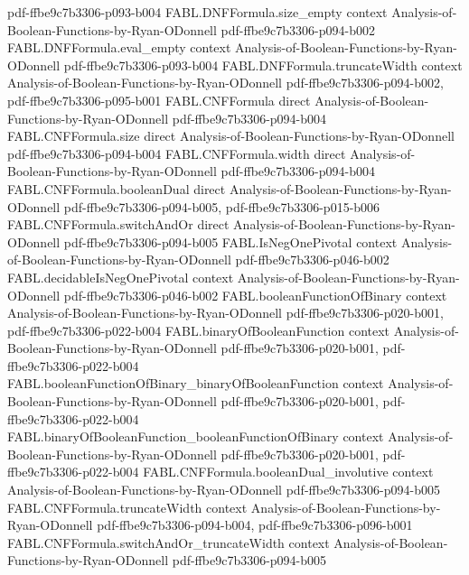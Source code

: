 \begin{theorem}
  {pdf-ffbe9c7b3306-p093-b004}
\proofstep
  {FABL.DNFFormula.size_empty}
  {context}
  {Analysis-of-Boolean-Functions-by-Ryan-ODonnell}
  {pdf-ffbe9c7b3306-p094-b002}
\proofstep
  {FABL.DNFFormula.eval_empty}
  {context}
  {Analysis-of-Boolean-Functions-by-Ryan-ODonnell}
  {pdf-ffbe9c7b3306-p093-b004}
\proofstep
  {FABL.DNFFormula.truncateWidth}
  {context}
  {Analysis-of-Boolean-Functions-by-Ryan-ODonnell}
  {pdf-ffbe9c7b3306-p094-b002,
    pdf-ffbe9c7b3306-p095-b001}
\proofstep
  {FABL.CNFFormula}
  {direct}
  {Analysis-of-Boolean-Functions-by-Ryan-ODonnell}
  {pdf-ffbe9c7b3306-p094-b004}
\proofstep
  {FABL.CNFFormula.size}
  {direct}
  {Analysis-of-Boolean-Functions-by-Ryan-ODonnell}
  {pdf-ffbe9c7b3306-p094-b004}
\proofstep
  {FABL.CNFFormula.width}
  {direct}
  {Analysis-of-Boolean-Functions-by-Ryan-ODonnell}
  {pdf-ffbe9c7b3306-p094-b004}
\proofstep
  {FABL.CNFFormula.booleanDual}
  {direct}
  {Analysis-of-Boolean-Functions-by-Ryan-ODonnell}
  {pdf-ffbe9c7b3306-p094-b005,
    pdf-ffbe9c7b3306-p015-b006}
\proofstep
  {FABL.CNFFormula.switchAndOr}
  {direct}
  {Analysis-of-Boolean-Functions-by-Ryan-ODonnell}
  {pdf-ffbe9c7b3306-p094-b005}
\proofstep
  {FABL.IsNegOnePivotal}
  {context}
  {Analysis-of-Boolean-Functions-by-Ryan-ODonnell}
  {pdf-ffbe9c7b3306-p046-b002}
\proofstep
  {FABL.decidableIsNegOnePivotal}
  {context}
  {Analysis-of-Boolean-Functions-by-Ryan-ODonnell}
  {pdf-ffbe9c7b3306-p046-b002}
\proofstep
  {FABL.booleanFunctionOfBinary}
  {context}
  {Analysis-of-Boolean-Functions-by-Ryan-ODonnell}
  {pdf-ffbe9c7b3306-p020-b001,
    pdf-ffbe9c7b3306-p022-b004}
\proofstep
  {FABL.binaryOfBooleanFunction}
  {context}
  {Analysis-of-Boolean-Functions-by-Ryan-ODonnell}
  {pdf-ffbe9c7b3306-p020-b001,
    pdf-ffbe9c7b3306-p022-b004}
\proofstep
  {FABL.booleanFunctionOfBinary_binaryOfBooleanFunction}
  {context}
  {Analysis-of-Boolean-Functions-by-Ryan-ODonnell}
  {pdf-ffbe9c7b3306-p020-b001,
    pdf-ffbe9c7b3306-p022-b004}
\proofstep
  {FABL.binaryOfBooleanFunction_booleanFunctionOfBinary}
  {context}
  {Analysis-of-Boolean-Functions-by-Ryan-ODonnell}
  {pdf-ffbe9c7b3306-p020-b001,
    pdf-ffbe9c7b3306-p022-b004}
\proofstep
  {FABL.CNFFormula.booleanDual_involutive}
  {context}
  {Analysis-of-Boolean-Functions-by-Ryan-ODonnell}
  {pdf-ffbe9c7b3306-p094-b005}
\proofstep
  {FABL.CNFFormula.truncateWidth}
  {context}
  {Analysis-of-Boolean-Functions-by-Ryan-ODonnell}
  {pdf-ffbe9c7b3306-p094-b004,
    pdf-ffbe9c7b3306-p096-b001}
\proofstep
  {FABL.CNFFormula.switchAndOr_truncateWidth}
  {context}
  {Analysis-of-Boolean-Functions-by-Ryan-ODonnell}
  {pdf-ffbe9c7b3306-p094-b005}

\end{theorem}
